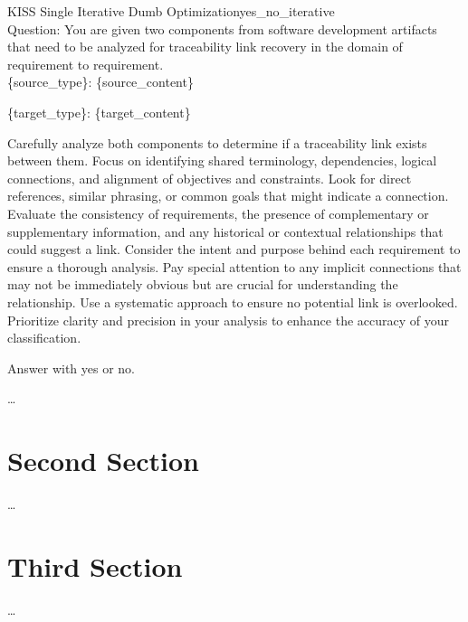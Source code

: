 \begin{prompt}{KISS Single Iterative Dumb Optimization}{yes_no_iterative}\\
    Question: You are given two components from software development artifacts that need to be analyzed for traceability link recovery in the domain of requirement to requirement.\\
    
    \{source\_type\}: \textquotesingle{}\textquotesingle{}\textquotesingle{}\{source\_content\}\textquotesingle{}\textquotesingle{}\textquotesingle{}

    \{target\_type\}: \textquotesingle{}\textquotesingle{}\textquotesingle{}\{target\_content\}\textquotesingle{}\textquotesingle{}\textquotesingle{}

    Carefully analyze both components to determine if a traceability link exists between them. Focus on identifying shared terminology, dependencies, logical connections, and alignment of objectives and constraints. Look for direct references, similar phrasing, or common goals that might indicate a connection. Evaluate the consistency of requirements, the presence of complementary or supplementary information, and any historical or contextual relationships that could suggest a link. Consider the intent and purpose behind each requirement to ensure a thorough analysis. Pay special attention to any implicit connections that may not be immediately obvious but are crucial for understanding the relationship. Use a systematic approach to ensure no potential link is overlooked. Prioritize clarity and precision in your analysis to enhance the accuracy of your classification.

    Answer with \textquotesingle{}yes\textquotesingle{} or \textquotesingle{}no\textquotesingle{}.
    
\end{prompt}

\begin{landscape}

\end{landscape}







\dots

\section{Second Section}
\label{sec:Evaluation:SecondSection}

\dots

\section{Third Section}
\label{sec:Evaluation:ThirdSection}

\dots
